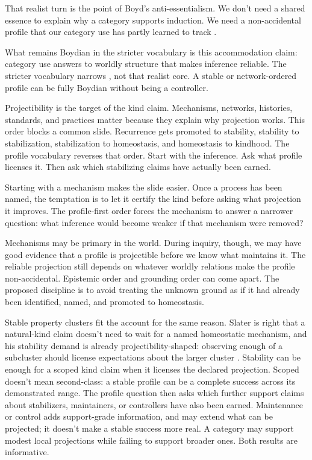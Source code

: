 \documentclass[12pt]{article}
\begin{document}
That realist turn is the point of Boyd's anti-essentialism. We don't need a
shared essence to explain why a category supports induction. We need a
non-accidental profile that our category use has partly learned to track
\citep{boyd1991}.

What remains Boydian in the stricter vocabulary is this accommodation claim:
category use answers to worldly structure that makes inference reliable. The
stricter vocabulary narrows , not that realist core. A stable or
network-ordered profile can be fully Boydian without being a controller.

Projectibility is the target of the kind claim. Mechanisms, networks,
histories, standards, and practices matter because they explain why projection
works.
This order blocks a common slide. Recurrence gets promoted to stability,
stability to stabilization, stabilization to homeostasis, and homeostasis to
kindhood. The profile vocabulary reverses that order. Start with the inference.
Ask what profile licenses it. Then ask which stabilizing claims have actually
been earned.

Starting with a mechanism makes the slide easier. Once a process has been named,
the temptation is to let it certify the kind before asking what projection it
improves. The profile-first order forces the mechanism to answer a narrower
question: what inference would become weaker if that mechanism were removed?

Mechanisms may be primary in the world. During inquiry, though, we may have good
evidence that a profile is projectible before we know what maintains it. The
reliable projection still depends on whatever worldly relations make the profile
non-accidental. Epistemic order and grounding order can come apart. The proposed
discipline is to avoid treating the unknown ground as if it had already been
identified, named, and promoted to homeostasis.

Stable property clusters fit the account for the same reason. Slater is right
that a natural-kind claim doesn't need to wait for a named homeostatic mechanism,
and his stability demand is already projectibility-shaped: observing enough of a
subcluster should license expectations about the larger cluster
\citep{slater2015}. Stability can be enough for a scoped kind claim when it
licenses the declared projection. Scoped doesn't mean second-class: a stable
profile can be a complete success across its demonstrated range. The profile
question then asks which further support claims about stabilizers, maintainers,
or controllers have also been earned. Maintenance or control adds support-grade
information, and may extend what can be projected; it doesn't make a stable
success more real. A category may support modest local projections while failing
to support broader ones. Both results are informative.
\end{document}
